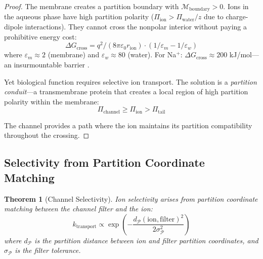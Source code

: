 \documentclass[twocolumn,10pt]{article}
\newtheorem{theorem}{Theorem}[section]
\theoremstyle{remark}
\newcommand{\Depth}{\mathcal{M}}
\newcommand{\Partition}{\mathcal{P}}
\newcommand{\eps}{\varepsilon}
\begin{document}
\begin{proof}
The membrane creates a partition boundary with $\Depth_{\text{boundary}} > 0$. Ions in the aqueous phase have high partition polarity ($\Pi_{\text{ion}} > \Pi_{\text{water}}/z$ due to charge-dipole interactions). They cannot cross the nonpolar interior without paying a prohibitive energy cost:
\begin{equation}
    \Delta G_{\text{cross}} = q^2 / (8\pi\eps_0 r_{\text{ion}}) \cdot (1/\eps_m - 1/\eps_w)
\end{equation}
where $\eps_m \approx 2$ (membrane) and $\eps_w \approx 80$ (water). For Na$^+$: $\Delta G_{\text{cross}} \approx 200$ kJ/mol---an insurmountable barrier \cite{parsegian1969}.

Yet biological function requires selective ion transport. The solution is a \emph{partition conduit}---a transmembrane protein that creates a local region of high partition polarity within the membrane:
\begin{equation}
    \Pi_{\text{channel}} \geq \Pi_{\text{ion}} > \Pi_{\text{tail}}
\end{equation}

The channel provides a path where the ion maintains its partition compatibility throughout the crossing.
\end{proof}

\subsection{Selectivity from Partition Coordinate Matching}

\begin{theorem}[Channel Selectivity]
\label{thm:selectivity}
Ion selectivity arises from partition coordinate matching between the channel filter and the ion:
\begin{equation}
    k_{\text{transport}} \propto \exp\left(-\frac{d_{\Partition}(\text{ion}, \text{filter})^2}{2\sigma_{\Partition}^2}\right)
\end{equation}
where $d_{\Partition}$ is the partition distance between ion and filter partition coordinates, and $\sigma_{\Partition}$ is the filter tolerance.
\end{theorem}
\end{document}
